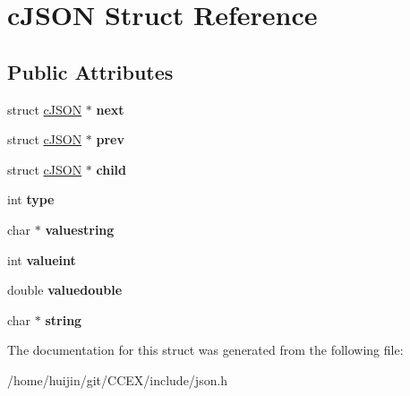 \hypertarget{structcJSON}{\section{c\-J\-S\-O\-N Struct Reference}
\label{structcJSON}
}
\subsection*{Public Attributes}
\begin{DoxyCompactItemize}
\item 
\hypertarget{structcJSON_ade862b880379b5e2a591f7326401fa8d}{struct \hyperlink{structcJSON}{c\-J\-S\-O\-N} $\ast$ {\bfseries next}}\label{structcJSON_ade862b880379b5e2a591f7326401fa8d}

\item 
\hypertarget{structcJSON_a488a393f610347821fce8e985e79fc2f}{struct \hyperlink{structcJSON}{c\-J\-S\-O\-N} $\ast$ {\bfseries prev}}\label{structcJSON_a488a393f610347821fce8e985e79fc2f}

\item 
\hypertarget{structcJSON_a401b274c2da358dac5c23ab8b2c71f85}{struct \hyperlink{structcJSON}{c\-J\-S\-O\-N} $\ast$ {\bfseries child}}\label{structcJSON_a401b274c2da358dac5c23ab8b2c71f85}

\item 
\hypertarget{structcJSON_ab13084c574681593b12f6e0a3db0dcfc}{int {\bfseries type}}\label{structcJSON_ab13084c574681593b12f6e0a3db0dcfc}

\item 
\hypertarget{structcJSON_ad43f8de2571e504c4c5ce0a36990e6e1}{char $\ast$ {\bfseries valuestring}}\label{structcJSON_ad43f8de2571e504c4c5ce0a36990e6e1}

\item 
\hypertarget{structcJSON_a369cea49494eb5d4409d532a731a0fbf}{int {\bfseries valueint}}\label{structcJSON_a369cea49494eb5d4409d532a731a0fbf}

\item 
\hypertarget{structcJSON_a4b21817d0fd2919901abadac73214e7f}{double {\bfseries valuedouble}}\label{structcJSON_a4b21817d0fd2919901abadac73214e7f}

\item 
\hypertarget{structcJSON_aa6b47e9a4b0e0a26f519b1a2b6739983}{char $\ast$ {\bfseries string}}\label{structcJSON_aa6b47e9a4b0e0a26f519b1a2b6739983}

\end{DoxyCompactItemize}


The documentation for this struct was generated from the following file\-:\begin{DoxyCompactItemize}
\item 
/home/huijin/git/\-C\-C\-E\-X/include/json.\-h\end{DoxyCompactItemize}
